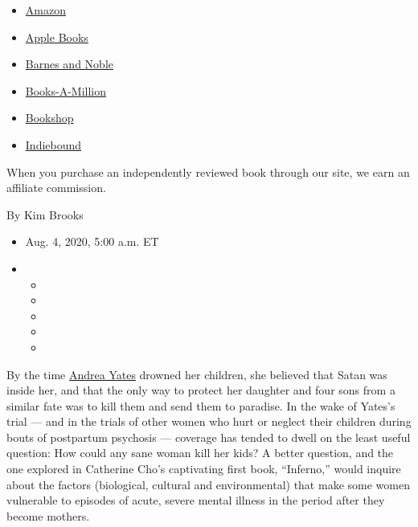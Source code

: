 \begin{itemize}
\tightlist
\item
  \href{https://www.amazon.com/gp/search?index=books\&tag=NYTBSREV-20\&field-keywords=Inferno\%3A+A+Memoir+of+Motherhood+and+Madness+Catherine+Cho}{Amazon}
\item
  \href{https://du-gae-books-dot-nyt-du-prd.appspot.com/buy?title=Inferno\%3A+A+Memoir+of+Motherhood+and+Madness\&author=Catherine+Cho}{Apple
  Books}
\item
  \href{https://www.anrdoezrs.net/click-7990613-11819508?url=https\%3A\%2F\%2Fwww.barnesandnoble.com\%2Fw\%2F\%3Fean\%3D9781250623713}{Barnes
  and Noble}
\item
  \href{https://www.anrdoezrs.net/click-7990613-35140?url=https\%3A\%2F\%2Fwww.booksamillion.com\%2Fp\%2FInferno\%253A\%2BA\%2BMemoir\%2Bof\%2BMotherhood\%2Band\%2BMadness\%2FCatherine\%2BCho\%2F9781250623713}{Books-A-Million}
\item
  \href{https://bookshop.org/a/3546/9781250623713}{Bookshop}
\item
  \href{https://www.indiebound.org/book/9781250623713?aff=NYT}{Indiebound}
\end{itemize}

When you purchase an independently reviewed book through our site, we
earn an affiliate commission.

By Kim Brooks

\begin{itemize}
\item
  Aug. 4, 2020, 5:00 a.m. ET
\item
  \begin{itemize}
  \item
  \item
  \item
  \item
  \item
  \end{itemize}
\end{itemize}

By the time
\href{https://www.nytimes.com/2001/09/08/us/despair-plagued-mother-held-in-children-s-deaths.html}{Andrea
Yates} drowned her children, she believed that Satan was inside her, and
that the only way to protect her daughter and four sons from a similar
fate was to kill them and send them to paradise. In the wake of Yates's
trial --- and in the trials of other women who hurt or neglect their
children during bouts of postpartum psychosis --- coverage has tended to
dwell on the least useful question: How could any sane woman kill her
kids? A better question, and the one explored in Catherine Cho's
captivating first book, ``Inferno,'' would inquire about the factors
(biological, cultural and environmental) that make some women vulnerable
to episodes of acute, severe mental illness in the period after they
become mothers.

